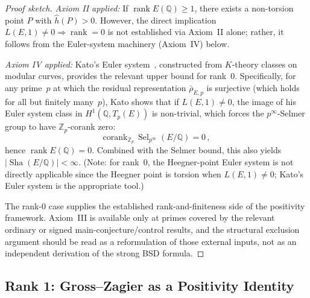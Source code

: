 \documentclass[aps,prd,twocolumn,superscriptaddress,nofootinbib,floatfix]{revtex4-2}
\theoremstyle{definition}
\theoremstyle{remark}
\DeclareMathOperator{\rank}{rank}
\DeclareMathOperator{\Sel}{Sel}
\DeclareMathOperator{\Sha}{Sha}
\begin{document}
\begin{proof}[Proof sketch]
\textit{Axiom II applied:} If $\rank E(\mathbb{Q}) \geq 1$, there exists a non-torsion point $P$ with $\hat{h}(P) > 0$. However, the direct implication $L(E,1) \neq 0 \Rightarrow \rank = 0$ is not established via Axiom~II alone; rather, it follows from the Euler-system machinery (Axiom~IV) below.

\textit{Axiom IV applied:} Kato's Euler system~\cite{Kato2004}, constructed from $K$-theory classes on modular curves, provides the relevant upper bound for rank~0. Specifically, for any prime~$p$ at which the residual representation $\bar{\rho}_{E,p}$ is surjective (which holds for all but finitely many~$p$), Kato shows that if $L(E,1) \neq 0$, the image of his Euler system class in $H^1(\mathbb{Q}, T_p(E))$ is non-trivial, which forces the $p^\infty$-Selmer group to have $\mathbb{Z}_p$-corank zero:
\begin{equation}
\mathrm{corank}_{\mathbb{Z}_p}\, \Sel_{p^\infty}(E/\mathbb{Q}) = 0\,,
\end{equation}
hence $\rank E(\mathbb{Q}) = 0$. Combined with the Selmer bound, this also yields $|\Sha(E/\mathbb{Q})| < \infty$. (Note: for rank~0, the Heegner-point Euler system is not directly applicable since the Heegner point is torsion when $L(E,1) \neq 0$; Kato's Euler system is the appropriate tool.)

The rank-0 case supplies the established rank-and-finiteness side of the positivity framework. Axiom~III is available only at primes covered by the relevant ordinary or signed main-conjecture/control results, and the structural exclusion argument should be read as a reformulation of those external inputs, not as an independent derivation of the strong BSD formula.
\end{proof}

\subsection{Rank 1: Gross--Zagier as a Positivity Identity}
\end{document}
